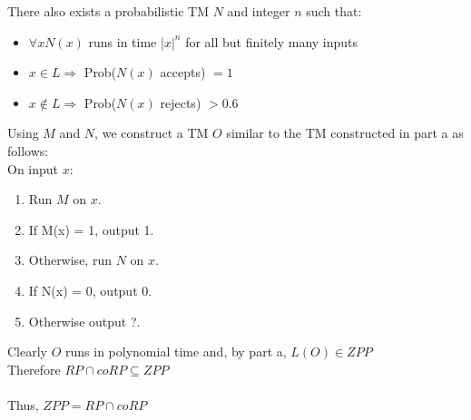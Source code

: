\documentclass[letterpaper,notitlepage,twoside]{article}
\begin{document}
There also exists a probabilistic TM $N$ and integer $n$ such that:
\begin{itemize}
\item $\forall x N(x)$ runs in time $|x|^{n}$ for all but finitely many inputs
\item $x \in L \Rightarrow$ Prob($N(x)$ accepts) $=1$
\item $x \notin L \Rightarrow$ Prob($N(x)$ rejects) $> 0.6$
\end{itemize}
Using $M$ and $N$, we construct a TM $O$ similar to the TM constructed in part a as follows: \\
On input $x$:
\begin{enumerate}
  \item Run $M$ on $x$.
  \item If M(x) = 1, output 1.
  \item Otherwise, run $N$ on $x$.
  \item If N(x) = 0, output 0.
  \item Otherwise output ?.
\end{enumerate}
Clearly $O$ runs in polynomial time and, by part a, $L(O) \in ZPP$ \\
Therefore $RP \cap coRP \subseteq ZPP$
\\ \\
Thus, $ZPP = RP \cap coRP$
\end{document}
